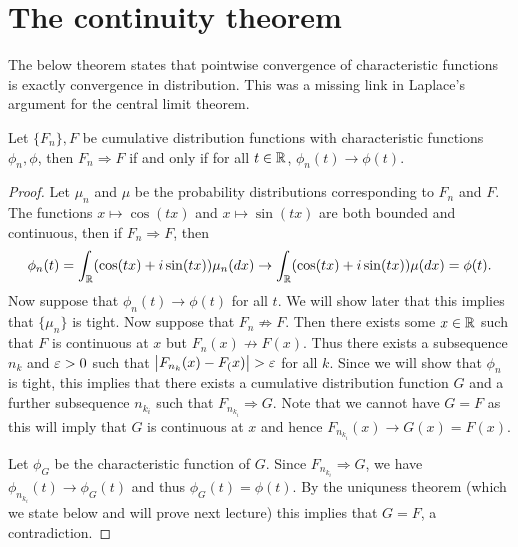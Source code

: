 \section{The continuity theorem}
The below theorem states that pointwise convergence of characteristic functions is exactly convergence in distribution. This was a missing link in Laplace's argument for the central limit theorem.
\begin{thrm}
    Let $\{F_n\},F$ be cumulative distribution functions with characteristic functions $\phi_n,\phi$, then $F_n \Rightarrow F$ if and only if for all $t \in {\mathbb R}$, $\phi_n(t)\to\phi(t)$.
\end{thrm}
\begin{proof}
    Let $\mu_n$ and $\mu$ be the probability distributions corresponding to $F_n$ and $F$. The functions $x\mapsto \cos(tx)$ and $x \mapsto \sin(tx)$ are both bounded and continuous, then if $F_n \Rightarrow F$, then 
    \[\phi_n(t) = \int_{\mathbb R} (\cos(tx)+i\sin(tx))\mu_n(dx) \to \int_{\mathbb R} (\cos(tx)+i\sin(tx))\mu(dx) = \phi(t). \]
    Now suppose that $\phi_n(t)\to\phi(t)$ for all $t$. We will show later that this implies that $\{\mu_n\}$ is tight. Now suppose that $F_n \not\Rightarrow F$. Then there exists some $x \in {\mathbb R}$ such that $F$ is continuous at $x$ but $F_n(x) \not\to F(x)$. Thus there exists a subsequence $n_k$ and $\varepsilon > 0$ such that ${\left\lvert F_{n_k}(x)-F_(x)\right\rvert} > \varepsilon$ for all $k$. Since we will show that $\phi_n$ is tight, this implies that there exists a cumulative distribution function $G$ and a further subsequence $n_{k_i}$ such that $F_{n_{k_i}}\Rightarrow G$. Note that we cannot have $G = F$ as this will imply that $G$ is continuous at $x$ and hence $F_{n_{k_i}}(x) \to G(x)=F(x)$. 

    Let $\phi_G$ be the characteristic function of $G$. Since $F_{n_{k_i}} \Rightarrow G$, we have $\phi_{n_{k_i}}(t)\to \phi_G(t)$ and thus $\phi_G(t)=\phi(t)$. By the uniquness theorem (which we state below and will prove next lecture) this implies that $G=F$, a contradiction.


\end{proof}
